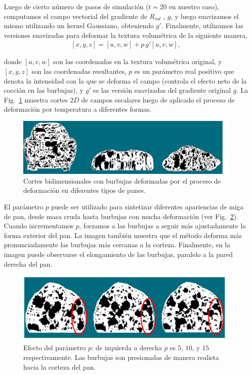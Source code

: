 Luego de cierto número de pasos de simulación ($t=20$ en nuestro caso), computamos el campo vectorial del gradiente de $R_{vol}$ \cite{Gonzalez2006}, $g$, y luego suavizamos el mismo utilizando un kernel Gaussiano, obteniendo $g'$.
Finalmente, utilizamos las versiones suavizadas para deformar la textura volumétrica de la siguiente manera,
\begin{align*}
\displaystyle
[x,y,z] = [u,v,w] + p\, g'[u,v,w],
\end{align*}

\noindent donde $[u,v,w]$ son las coordenadas en la textura volumétrica original, y $[x,y,z]$ son las coordenadas resultantes, $p$ es un parámetro real positivo que denota la intensidad con la que se deforma el campo (controla el efecto neto de la cocción en las burbujas), y $g'$ es las versión suavizadas del gradiente original $g$.
La Fig.~\ref{fg:bakedbubbles} muestra cortes $2D$ de campos escalares luego de aplicado el proceso de deformación por temperatura a diferentes formas.

\begin{figure}
\includegraphics[width=12cm]{figures/bakedbubbles}
\caption{Cortes bidimensionales con burbujas deformadas por el proceso de deformación en diferentes tipos de panes.}
\label{fg:bakedbubbles}
\end{figure}

El parámetro $p$ puede ser utilizado para sintetizar diferentes apariencias de miga de pan, desde masa cruda hasta burbujas con mucha deformación (ver Fig.~\ref{fg:parameterp}).
Cuando incrementamos $p$, forzamos a las burbujas a seguir más ajustadamente la forma exterior del pan. 
La imagen también muestra que el método deforma más pronunciadamente las burbujas más cercanas a la corteza.
Finalmente, en la imagen puede observarse el elongamiento de las burbujas, paralelo a la pared derecha del pan.

\begin{figure}
\includegraphics[width=12cm]{figures/parameterp}
\caption[Efecto del parámetro $p$ en la simulación de cocción]{Efecto del parámetro $p$: de izquierda a derecha $p$ es $5$, $10$, y $15$ respectivamente. Las burbujas son presionadas de manera realista hacia la corteza del pan.}
\label{fg:parameterp}
\end{figure}

